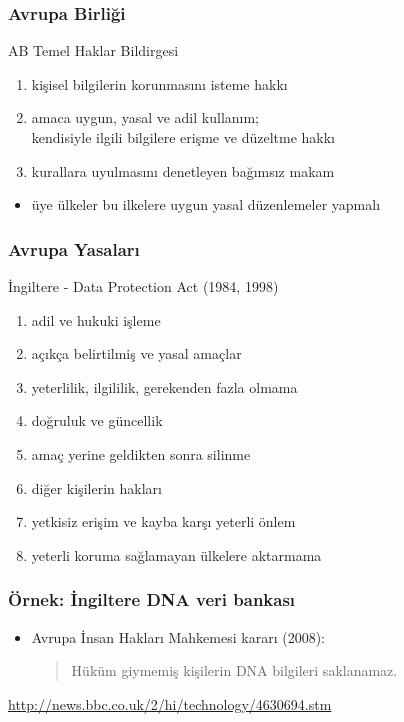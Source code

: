 \documentclass[dvipsnames]{beamer}
\theoremstyle{definition}
\theoremstyle{example}
\theoremstyle{plain}
\begin{document}
\begin{frame}
  \frametitle{Avrupa Birliği}

  \begin{block}{AB Temel Haklar Bildirgesi}
    \begin{enumerate}
      \item kişisel bilgilerin korunmasını isteme hakkı
      \item amaca uygun, yasal ve adil kullanım;\\
        kendisiyle ilgili bilgilere erişme ve düzeltme hakkı
      \item kurallara uyulmasını denetleyen bağımsız makam
    \end{enumerate}
  \end{block}

  \begin{itemize}
    \item üye ülkeler bu ilkelere uygun yasal düzenlemeler yapmalı
  \end{itemize}
\end{frame}

\begin{frame}
  \frametitle{Avrupa Yasaları}

  \begin{block}{İngiltere - Data Protection Act (1984, 1998)}
    \begin{enumerate}
      \item adil ve hukuki işleme
      \item açıkça belirtilmiş ve yasal amaçlar
      \item yeterlilik, ilgililik, gerekenden fazla olmama
      \item doğruluk ve güncellik
      \item amaç yerine geldikten sonra silinme
      \item diğer kişilerin hakları
      \item yetkisiz erişim ve kayba karşı yeterli önlem
      \item yeterli koruma sağlamayan ülkelere aktarmama
    \end{enumerate}
  \end{block}
\end{frame}

\begin{frame}
  \frametitle{Örnek: İngiltere DNA veri bankası}

  \begin{center}
  \end{center}

  \begin{itemize}
    \item Avrupa İnsan Hakları Mahkemesi kararı (2008):
    \begin{quote}
      Hüküm giymemiş kişilerin DNA bilgileri saklanamaz.
    \end{quote}
  \end{itemize}

  \medskip
  \tiny{\url{http://news.bbc.co.uk/2/hi/technology/4630694.stm}}\\
\end{frame}
\end{document}
